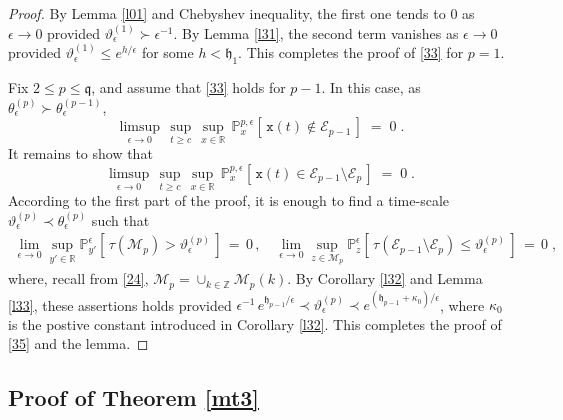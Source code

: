 \documentclass[reqno]{amsart}
\theoremstyle{plain}
\theoremstyle{definition}
\newcommand{\mf}[1]{{\mathfrak #1}}
\newcommand{\bb}[1]{{\mathbb #1}}
\newcommand{\ms}[1]{{\mathscr #1}}
\newcommand{\mtt}[1]{{\mathtt #1}}
\newcounter{as}[section]
\newcommand{\<}{\langle}
\renewcommand{\>}{\rangle}
\begin{document}
\begin{proof}
By Lemma \ref{l01} and Chebyshev inequality, the first one tends to
$0$ as $\epsilon\to 0$ provided
$\vartheta^{(1)}_\epsilon \succ \epsilon^{-1}$. By Lemma \ref{l31},
the second term vanishes as $\epsilon\to 0$ provided
$\vartheta^{(1)}_\epsilon \le e^{h/\epsilon}$ for some $h<\mf
h_1$. This completes the proof of \eqref{33} for $p=1$.

Fix $2\le p\le \mf q$, and assume that \eqref{33} holds for $p-1$. In
this case, as $\theta^{(p)}_\epsilon \succ \theta^{(p-1)}_\epsilon$,
\begin{equation*}
\limsup_{\epsilon\to0}\,
\sup_{t\ge c}\, \sup_{x\in \bb R}\,
\bb P_{x}^{p, \epsilon}    [\, \mtt x(t) \notin \ms E_{p-1} \, ] \;=\; 0\;.
\end{equation*}
It remains to show that
\begin{equation}
\label{35}
\limsup_{\epsilon\to0}\,
\sup_{t\ge c}\, \sup_{x\in \bb R}\,
\bb P_{x}^{p, \epsilon}    [\, \mtt x(t) \in
\ms E_{p-1}  \setminus \ms E_p \, ] \;=\; 0\;.
\end{equation}
According to the first part of the proof, it is enough to find a
time-scale $\vartheta^{(p)}_\epsilon \prec \theta^{(p)}_\epsilon$ such
that 
\begin{equation*}
\begin{aligned}
\lim_{\epsilon\to 0} \sup_{y'\in \bb R}
\bb P_{y'}^{\epsilon} [\, \tau (\ms M_p) > \vartheta^{(p)}_\epsilon \, ]
\,=\, 0\,, 
\quad 
\lim_{\epsilon\to 0} \sup_{z\in \ms M_p}
\bb P_{z}^{\epsilon} [\, \tau (\ms E_{p-1} \setminus \ms E_p)
\le \vartheta^{(p)}_\epsilon \, ] \,=\, 0 \;,
\end{aligned}
\end{equation*}
where, recall from \eqref{24},
$\ms M_p = \cup_{k\in\bb Z} \ms M_p(k)$. By Corollary \ref{l32} and
Lemma \ref{l33}, these assertions holds provided
$\epsilon^{-1} \, e^{\mf h_{p-1}/\epsilon} \prec
\vartheta^{(p)}_\epsilon \prec e^{(\mf h_{p-1} + \kappa_0)/\epsilon}
$, where $\kappa_0$ is the postive constant introduced in Corollary
\ref{l32}. This completes the proof of \eqref{35} and the lemma.
\end{proof}

\subsection*{Proof of Theorem \ref{mt3}}
\end{document}
